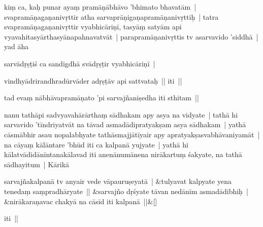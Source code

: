 \documentclass[article,12pt,a4paper]{memoir}%
\newcounter{parCount}
\begin{document}
	  
	  \pstart \leavevmode%
	\label{thakur75-29.1}kiṃ ca, kaḥ punar ayaṃ pramāṇābhāvo 'bhimato bhavatām | svapramāṇagaṇanivṛttir atha sarvaprāṇigaṇapramāṇanivṛttiḥ | tatra svapramāṇagaṇanivṛttir vyabhicāriṇī, tasyāṃ satyām api vyavahitasyārthasyānapahnavatvāt | parapramāṇanivṛttis tv asarvavido 'siddhā | yad āha 
	{}
	\pend%
      

	  
	  \pstart \leavevmode%
	sarvādṛṣṭiś ca sandigdhā svādṛṣṭir vyabhicāriṇī | 
	{}
	\pend%
      

	  
	  \pstart \leavevmode%
	vindhyādrirandhradūrvāder adṛṣṭāv api sattvataḥ || iti || 
	{}
	\pend%
      

	  
	  \pstart \leavevmode%
	tad evaṃ nābhāvapramāṇato 'pi sarvajñaniṣedha iti sthitam || 
	{}
	\pend%
      

	  
	  \pstart \leavevmode%
	\label{thakur75-29.8}nanu tathāpi sadvyavahārārthaṃ sādhakam apy asya na vidyate | tathā hi sarvavido 'tīndriyatvāt na tāvad asmadādipratyakṣam asya sādhakam | yathā cāsmābhir asau nopalabhyate tathāsmajjātīyair apy apratyakṣasvabhāvaniyamāt | na cāyaṃ kālāntare 'bhūd iti ca kalpanā yujyate | yathā hi kālatvādidānīntanakālavad iti anenānumānena nirākartuṃ śakyate, na tathā sādhayitum | Kārikā 
	{}
	\pend%
      
	    
	    \stanza[\smallbreak]
	  sarvajñakalpanā tv anyair vede vāpauruṣeyatā | &tulyavat kalpyate yena tenedaṃ saṃpradhāryate || &sarvajño dṛśyate tāvan nedānīm asmadādibhiḥ | &nirākaraṇavac chakyā na cāsīd iti kalpanā ||\&[\smallbreak]
	  
	  
	  

	  
	  \pstart \leavevmode%
	iti ||
	{}
	\pend%
      
\end{document}
